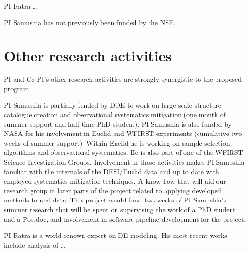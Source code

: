PI Ratra \ldots

PI Samushia has not previously been funded by the NSF.

\section{Other research activities}

PI and Co-PI's other research activities are strongly synergistic to the
proposed program.

PI Samushia is partially funded by DOE to work on large-scale structure
catalogue creation and observational systematics mitigation (one month of
summer support and half-time PhD student). PI Samushia is also funded by NASA
for his involvement in Euclid and WFIRST experiments (cumulative two weeks of
summer support). Within Euclid he is working on sample selection algorithms
and observational systematics. He is also part of one of the WFIRST Science
Investigation Groups. Involvement in these activities makes PI Samushia
familiar with  the internals of the DESI/Euclid data and up to date with
employed systematics mitigation techniques. A know-how that will aid our
research group in later parts of the project related to applying  developed
methods to real data. This project would fund two weeks of PI Samushia's
summer research that will be spent on supervising the work of a PhD student
and a Postdoc, and involvement in software pipeline development for the
project.

PI Ratra is a world renown expert on DE modeling. His most recent works include
analysis of \ldots



